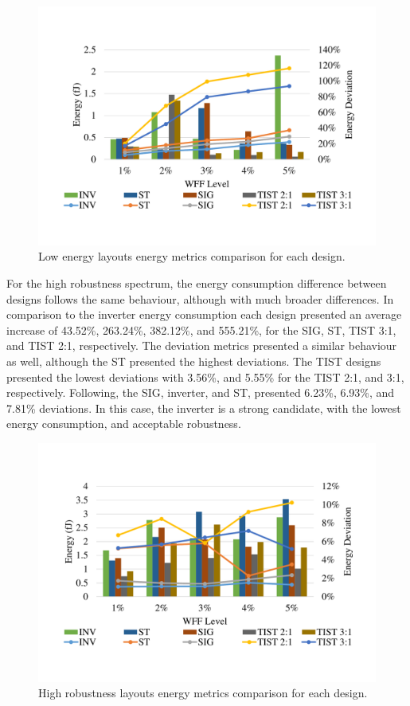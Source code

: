 \documentclass[pgmicro,mestrado,english]{iiufrgs}
\begin{document}
    \begin{figure}[]
        \centering
            \includegraphics[width=1\textwidth, trim={1.25cm 3cm 2cm 3cm}, clip]{compLowEnergy.pdf}
            \caption{Low energy layouts energy metrics comparison for each design.}
        \label{figCompLowEnergy}
    \end{figure}

    For the high robustness spectrum, the energy consumption difference between designs follows the same behaviour, although with much broader differences. In comparison to the inverter energy consumption each design presented an average increase of 43.52\%, 263.24\%, 382.12\%, and 555.21\%, for the SIG, ST, TIST 3:1, and TIST 2:1, respectively. The deviation metrics presented a similar behaviour as well, although the ST presented the highest deviations. The TIST designs presented the lowest deviations with 3.56\%, and 5.55\% for the TIST 2:1, and 3:1, respectively. Following, the SIG, inverter, and ST, presented 6.23\%, 6.93\%, and 7.81\% deviations. In this case, the inverter is a strong candidate, with the lowest energy consumption, and acceptable robustness. 

    \begin{figure}[]
        \centering
            \includegraphics[width=1\textwidth, trim={1.25cm 3cm 2cm 3cm}, clip]{compHighRobustness.pdf}
            \caption{High robustness layouts energy metrics comparison for each design.}
        \label{figCompHighRobustness}
    \end{figure}
    
\end{document}
